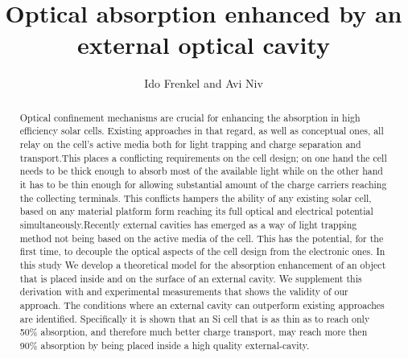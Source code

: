 \documentclass[a4paper]{article}
\title{Optical absorption enhanced by an external optical cavity}
\author{Ido Frenkel and Avi Niv}
\begin{document}
\maketitle

\begin{abstract}
\noindent Optical confinement mechanisms are crucial for enhancing the absorption in high efficiency solar cells. Existing approaches in that regard, as well as conceptual ones, all relay on the cell's active media both for light trapping and charge separation and transport.This places a conflicting requirements on the cell design; on one hand the cell needs to be thick enough to absorb most of the available light while on the other hand it has to be thin enough for allowing substantial amount of the charge carriers reaching the collecting terminals. This conflicts hampers the ability of any existing solar cell, based on any material platform form reaching its full optical and electrical potential simultaneously.Recently external cavities has emerged as a way of light trapping method not being based on the active media of the cell. This has the potential, for the first time, to decouple the optical aspects of the cell design from the electronic ones. In this study We develop a theoretical model for the absorption enhancement of an object that is placed inside and on the surface of an external cavity. We supplement this derivation with and experimental measurements that shows the validity of our approach. The conditions where an external cavity can outperform existing approaches are identified. Specifically it is shown that an Si cell that is as thin as to reach only 50\% absorption, and therefore much better charge transport, may reach more then 90\% absorption by being placed inside a high quality external-cavity.
\end{abstract}

\end{document}
